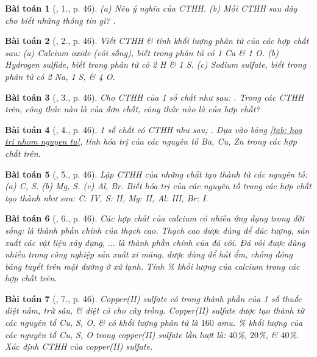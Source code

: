 \documentclass{article}
\newtheorem{baitoan}{Bài toán}
\begin{document}
\begin{baitoan}[\cite{SGK_KHTN_7_Canh_Dieu}, 1., p. 46]
	(a) Nêu ý nghĩa của CTHH. (b) Mỗi CTHH sau đây cho biết những thông tin gì? \emph{}.
\end{baitoan}

\begin{baitoan}[\cite{SGK_KHTN_7_Canh_Dieu}, 2., p. 46]
	Viết CTHH \& tính khối lượng phân tử của các hợp chất sau: (a) Calcium oxide (vôi sống), biết trong phân tử có \emph{1 Ca \& 1 O}. (b) Hydrogen sulfide, biết trong phân tử có \emph{2 H \& 1 S}. (c) Sodium sulfate, biết trong phân tử có \emph{2 Na, 1 S, \& 4 O}.
\end{baitoan}

\begin{baitoan}[\cite{SGK_KHTN_7_Canh_Dieu}, 3., p. 46]
	Cho CTHH của 1 số chất như sau: \emph{}. Trong các CTHH trên, công thức nào là của đơn chất, công thức nào là của hợp chất?
\end{baitoan}

\begin{baitoan}[\cite{SGK_KHTN_7_Canh_Dieu}, 4., p. 46]
	1 số chất có CTHH như sau; \emph{}. Dựa vào bảng \ref{tab: hoa tri nhom nguyen tu}, tính hóa trị của các nguyên tố \emph{Ba, Cu, Zn} trong các hợp chất trên.
\end{baitoan}

\begin{baitoan}[\cite{SGK_KHTN_7_Canh_Dieu}, 5., p. 46]
	Lập CTHH của những chất tạo thành từ các nguyên tố: (a) \emph{C, S}. (b) \emph{Mg, S}. (c) \emph{Al, Br}. Biết hóa trị của các nguyên tố trong các hợp chất tạo thành như sau: \emph{C: IV, S: II, Mg: II, Al: III, Br: I}.
\end{baitoan}

\begin{baitoan}[\cite{SGK_KHTN_7_Canh_Dieu}, 6., p. 46]
	Các hợp chất của calcium có nhiều ứng dụng trong đời sống: \emph{} là thành phần chính của thạch cao. Thạch cao được dùng để đúc tượng, sản xuất các vật liệu xây dựng, $\ldots$ \emph{} là thành phần chính của đá vôi. Đá vôi được dùng nhiều trong công nghiệp sản xuất xi măng. \emph{} được dùng để hút ẩm, chống đóng băng tuyết trên mặt đường ở xứ lạnh. Tính \% khối lượng của calcium trong các hợp chất trên.
\end{baitoan}

\begin{baitoan}[\cite{SGK_KHTN_7_Canh_Dieu}, 7., p. 46]
	Copper(II) sulfate có trong thành phần của 1 số thuốc diệt nấm, trừ sâu, \& diệt cỏ cho cây trồng. Copper(II) sulfate được tạo thành từ các nguyên tố \emph{Cu, S, O}, \& có khối lượng phân tử là $160$ amu. \% khối lượng của các nguyên tố \emph{Cu, S, O} trong copper(II) sulfate lần lượt là: $40$\%, $20$\%, \& $40$\%. Xác định CTHH của copper(II) sulfate. 
\end{baitoan}
\end{document}
